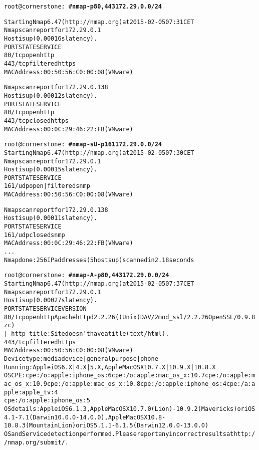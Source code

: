\documentclass[20pt,landscape,a4paper,footrule]{foils}
\begin{document}

\begin{alltt}\small
root@cornerstone:~#{\bfseries  nmap -p80,443 172.29.0.0/24}

Starting Nmap 6.47 ( http://nmap.org ) at 2015-02-05 07:31 CET
Nmap scan report for 172.29.0.1
Host is up (0.00016s latency).
PORT    STATE    SERVICE
{\color{darkgreen}80/tcp  open     http}
443/tcp filtered https
MAC Address: 00:50:56:C0:00:08 (VMware)

Nmap scan report for 172.29.0.138
Host is up (0.00012s latency).
PORT    STATE  SERVICE
{\color{darkgreen}80/tcp  open   http}
443/tcp closed https
MAC Address: 00:0C:29:46:22:FB (VMware)

\end{alltt}


\begin{alltt}\small
root@cornerstone:~#{\bfseries nmap -sU -p 161 172.29.0.0/24}
Starting Nmap 6.47 ( http://nmap.org ) at 2015-02-05 07:30 CET
Nmap scan report for 172.29.0.1
Host is up (0.00015s latency).
PORT    STATE         SERVICE
{\color{darkgreen}161/udp open|filtered snmp}
MAC Address: 00:50:56:C0:00:08 (VMware)

Nmap scan report for 172.29.0.138
Host is up (0.00011s latency).
PORT    STATE  SERVICE
161/udp closed snmp
MAC Address: 00:0C:29:46:22:FB (VMware)
...
Nmap done: 256 IP addresses (5 hosts up) scanned in 2.18 seconds
\end{alltt}

\begin{alltt}\footnotesize
root@cornerstone:~#{\bfseries nmap -A -p80,443 172.29.0.0/24}
Starting Nmap 6.47 ( http://nmap.org ) at 2015-02-05 07:37 CET
Nmap scan report for 172.29.0.1
Host is up (0.00027s latency).
PORT    STATE    SERVICE VERSION
80/tcp  open     http    Apache httpd 2.2.26 ((Unix) DAV/2 mod_ssl/2.2.26 OpenSSL/0.9.8zc)
|_http-title: Site doesn't have a title (text/html).
443/tcp filtered https
MAC Address: 00:50:56:C0:00:08 (VMware)
Device type: media device|general purpose|phone
Running: Apple iOS 6.X|4.X|5.X, Apple Mac OS X 10.7.X|10.9.X|10.8.X
OS CPE: cpe:/o:apple:iphone_os:6 cpe:/o:apple:mac_os_x:10.7 cpe:/o:apple:mac_os_x:10.9 cpe:/o:apple:mac_os_x:10.8 cpe:/o:apple:iphone_os:4 cpe:/a:apple:apple_tv:4
cpe:/o:apple:iphone_os:5
OS details: Apple iOS 6.1.3, Apple Mac OS X 10.7.0 (Lion) - 10.9.2 (Mavericks) or iOS 4.1 - 7.1 (Darwin 10.0.0 - 14.0.0), Apple Mac OS X 10.8 - 10.8.3 (Mountain Lion) or iOS 5.1.1 - 6.1.5 (Darwin 12.0.0 - 13.0.0)
OS and Service detection performed. Please report any incorrect results at http://nmap.org/submit/ .
\end{alltt}
\end{document}
